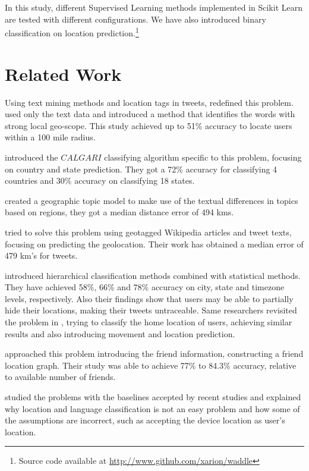 \documentclass[twoside,11pt]{article}
\begin{document}
In this study, different Supervised Learning methods implemented in Scikit Learn\cite{scikit-learn} are tested with different configurations. We have also introduced binary classification on location prediction.\footnote{Source code available at \url{http://www.github.com/xarion/waddle}}

\section{Related Work}

Using text mining methods and location tags in tweets, \cite{cheng2010you} redefined this problem. \cite{cheng2010you} used only the text data and introduced a method that identifies the words with strong local geo-scope. This study achieved up to 51\% accuracy to locate users within a 100 mile radius. 

\cite{hecht2011tweets} introduced the $CALGARI$ classifying algorithm specific to this problem, focusing on country and state prediction. They got a 72\% accuracy for classifying 4 countries and 30\% accuracy on classifying 18 states. 

\cite{eisenstein2010latent} created a geographic topic model to make use of the textual differences in topics based on regions, they got a median distance error of 494 kms. 

\cite{wing2011simple} tried to solve this problem using geotagged Wikipedia articles and tweet texts, focusing on predicting the geolocation. Their work has obtained a median error of 479 km's for tweets. 

\cite{mahmud2012tweet} introduced hierarchical classification methods combined with statistical methods. They have achieved 58\%, 66\% and 78\% accuracy on city, state and timezone levels, respectively. Also their findings show that users may be able to partially hide their locations, making their tweets untraceable. Same researchers revisited the problem in \cite{mahmud2014home}, trying to classify the home location of users, achieving similar results and also introducing movement and location prediction. 

\cite{sadilek2012finding} approached this problem introducing the friend information, constructing a friend location graph. Their study was able to achieve 77\% to 84.3\% accuracy, relative to available number of friends.

\cite{graham2014world} studied the problems with the baselines accepted by recent studies and explained why location and language classification is not an easy problem and how some of the assumptions are incorrect, such as accepting the device location as user's location. 
\end{document}
